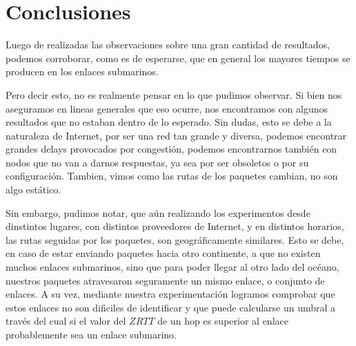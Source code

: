 \section{Conclusiones}

Luego de realizadas las observaciones sobre una gran cantidad de resultados, podemos corroborar, como es de esperarse, que en general los mayores tiempos se producen en los enlaces submarinos.

Pero decir esto, no es realmente pensar en lo que pudimos observar. Si bien nos aseguramos en lineas generales que eso ocurre, nos encontramos con algunos resultados que no estaban dentro de lo esperado. Sin dudas, esto se debe a la naturaleza de Internet, por ser una red tan grande y diversa, podemos encontrar grandes delays provocados por congesti\'on, podemos encontrarnos tambi\'en con nodos que no van a darnos respuestas, ya sea por ser obsoletos o por su configuraci\'on. Tambien, vimos como las rutas de los paquetes cambian, no son algo est\'atico. 

Sin embargo, pudimos notar, que a\'un realizando los experimentos desde dinstintos lugares, con distintos proveedores de Internet, y en distintos horarios, las rutas seguidas por los paquetes, son geogr\'aficamente similares. Esto se debe, en caso de estar enviando paquetes hacia otro continente, a que no existen muchos enlaces submarinos, sino que para poder llegar al otro lado del oc\'eano, nuestros paquetes atravesaron seguramente un mismo enlace, o conjunto de enlaces. A su vez, mediante nuestra experimentación logramos comprobar que estos enlaces no son dificiles de identificar y que puede calcularse un umbral a través del cual si el valor del $ZRTT$ de un hop es superior al enlace probablemente sea un enlace submarino.